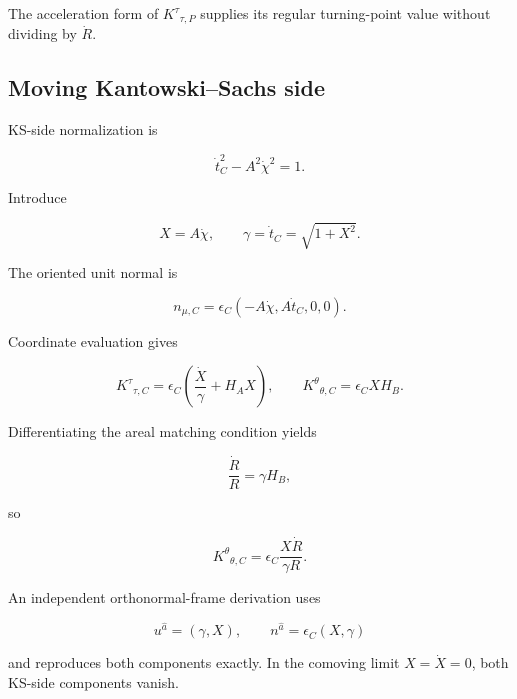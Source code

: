 \documentclass[pdflatex,sn-mathphys-num]{sn-jnl}
\begin{document}
The acceleration form of \(K^\tau{}_{\tau,P}\) supplies its regular turning-point value without dividing by \(\dot R\).


\subsection{Moving Kantowski--Sachs side}

KS-side normalization is


\begin{equation}
\dot t_C^2-A^2\dot\chi^2=1.
\tag{14}
\end{equation}

Introduce


\begin{equation}
X=A\dot\chi,
\qquad
\gamma=\dot t_C=\sqrt{1+X^2}.
\tag{15}
\end{equation}

The oriented unit normal is


\begin{equation}
n_{\mu,C}
=\epsilon_C(-A\dot\chi,A\dot t_C,0,0).
\tag{16}
\end{equation}

Coordinate evaluation gives


\begin{equation}
\boxed{
K^\tau{}_{\tau,C}
=\epsilon_C\left(\frac{\dot X}{\gamma}+H_AX\right),
\qquad
K^\theta{}_{\theta,C}
=\epsilon_CXH_B.
}
\tag{17}
\end{equation}

Differentiating the areal matching condition yields


\begin{equation}
\frac{\dot R}{R}=\gamma H_B,
\tag{18}
\end{equation}

so


\begin{equation}
\boxed{
K^\theta{}_{\theta,C}
=\epsilon_C\frac{X\dot R}{\gamma R}.
}
\tag{19}
\end{equation}

An independent orthonormal-frame derivation uses


\begin{equation}
u^{\hat a}=(\gamma,X),
\qquad
n^{\hat a}=\epsilon_C(X,\gamma)
\tag{20}
\end{equation}

and reproduces both components exactly. In the comoving limit \(X=\dot X=0\), both KS-side components vanish.
\end{document}
